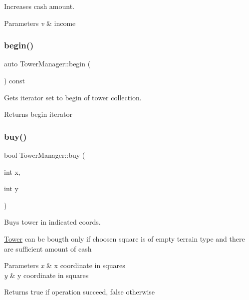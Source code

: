 Increases cash amount. 


\begin{DoxyParams}{Parameters}
{\em v} & income \\
\hline
\end{DoxyParams}
\mbox{\label{class_tower_manager_a90d1ce46145a7b52d50308ab29de5616}} 
\subsubsection{\texorpdfstring{begin()}{begin()}}
{\footnotesize\ttfamily auto Tower\+Manager\+::begin (\begin{DoxyParamCaption}{ }\end{DoxyParamCaption}) const\hspace{0.3cm}{\ttfamily [inline]}}



Gets iterator set to begin of tower collection. 

\begin{DoxyReturn}{Returns}
begin iterator 
\end{DoxyReturn}
\mbox{\label{class_tower_manager_a72ecf5954505cd071860b4468669c5bd}} 
\subsubsection{\texorpdfstring{buy()}{buy()}}
{\footnotesize\ttfamily bool Tower\+Manager\+::buy (\begin{DoxyParamCaption}\item[{int}]{x,  }\item[{int}]{y }\end{DoxyParamCaption})}



Buys tower in indicated coords. 

\mbox{\hyperlink{class_tower}{Tower}} can be bougth only if choosen square is of empty terrain type and there are sufficient amount of cash 
\begin{DoxyParams}{Parameters}
{\em x} & x coordinate in squares \\
\hline
{\em y} & y coordinate in squares \\
\hline
\end{DoxyParams}
\begin{DoxyReturn}{Returns}
true if operation succeed, false otherwise 
\end{DoxyReturn}
\mbox{\label{class_tower_manager_a66cb83ad5d16ae63806b65d34768645e}} 
